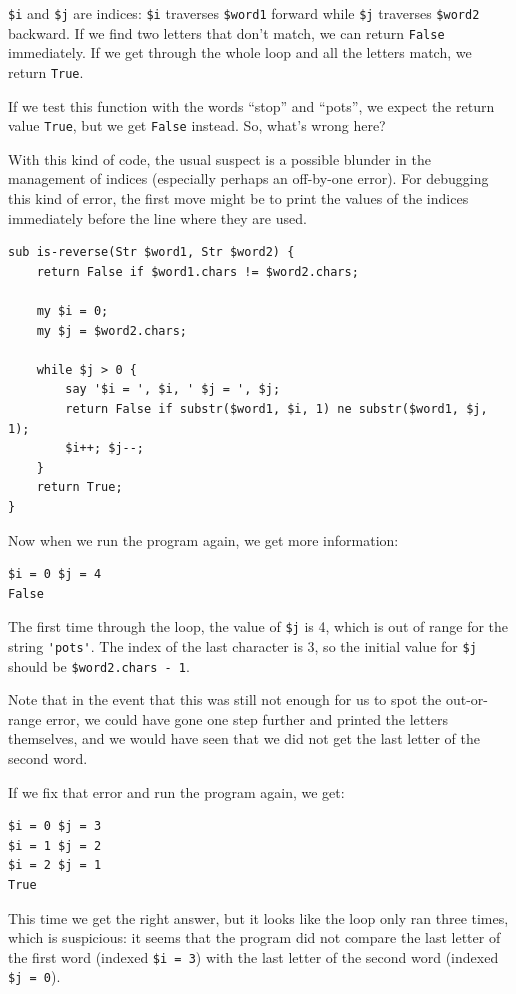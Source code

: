 {\tt \$i} and {\tt \$j} are indices: {\tt \$i} traverses 
{\tt \$word1} forward while {\tt \$j} traverses {\tt \$word2} 
backward.  If we find two letters that don't match, we 
can return {\tt False} immediately. If we get through the 
whole loop and all the letters match, we return {\tt True}.

If we test this function with the words ``stop'' and 
``pots'', we expect the return value {\tt True}, but we get 
{\tt False} instead. So, what's wrong here?

With this kind of code, the usual suspect is a possible 
blunder in the management of indices (especially perhaps 
an off-by-one error). For debugging this kind of error, 
the first move might be to print the values of the indices 
immediately before the line where they are used.

\begin{verbatim}
sub is-reverse(Str $word1, Str $word2) {
    return False if $word1.chars != $word2.chars;
    
    my $i = 0;
    my $j = $word2.chars;

    while $j > 0 {
        say '$i = ', $i, ' $j = ', $j;
        return False if substr($word1, $i, 1) ne substr($word1, $j, 1);
        $i++; $j--;
    }
    return True;
}
\end{verbatim}
%
Now when we run the program again, we get more information:

\begin{verbatim}
$i = 0 $j = 4
False
\end{verbatim}
%
The first time through the loop, the value of {\tt \$j} is 4,
which is out of range for the string \verb"'pots'".
The index of the last character is 3, so the
initial value for {\tt \$j} should be {\tt \$word2.chars - 1}.

Note that in the event that this was still not enough for us to 
spot the out-or-range error, we could have gone one step 
further and printed the letters themselves, and we would 
have seen that we did not get the last letter of the second 
word.

If we fix that error and run the program again, we get:

\begin{verbatim}
$i = 0 $j = 3
$i = 1 $j = 2
$i = 2 $j = 1
True
\end{verbatim}
%
This time we get the right answer, but it looks like the 
loop only ran three times, which is suspicious: it seems 
that the program did not compare the last letter of the 
first word (indexed {\tt \$i = 3}) with the last letter of 
the second word (indexed {\tt \$j = 0}).  

